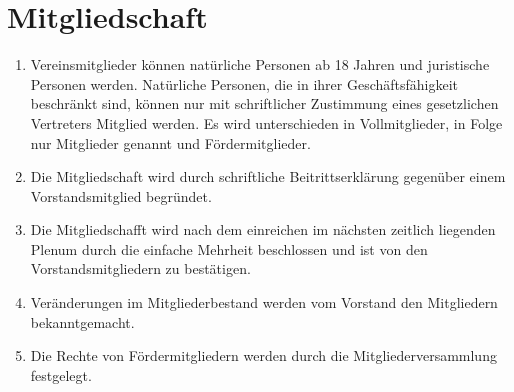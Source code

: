 \documentclass[ngerman]{scrartcl}
\begin{document}
\section{Mitgliedschaft} \label{sec:mitgliedschaft}
\begin{enumerate}
 \item Vereinsmitglieder können natürliche Personen ab 18 Jahren
 und  juristische Personen werden. Natürliche Personen, die in
 ihrer Geschäftsfähigkeit beschränkt sind, können nur mit
 schriftlicher Zustimmung eines gesetzlichen Vertreters
 Mitglied werden. Es wird unterschieden in Vollmitglieder, in
 Folge nur Mitglieder genannt und Fördermitglieder.

 \item Die Mitgliedschaft wird durch schriftliche
 Beitrittserklärung gegenüber einem Vorstandsmitglied
 begründet.

 \item Die Mitgliedschafft wird nach dem einreichen im nächsten
 zeitlich liegenden Plenum durch die einfache Mehrheit beschlossen
 und ist von den Vorstandsmitgliedern zu bestätigen.

 \item Veränderungen im Mitgliederbestand werden vom Vorstand
 den Mitgliedern bekanntgemacht.

 \item Die Rechte von Fördermitgliedern werden durch die
 Mitgliederversammlung festgelegt.
\end{enumerate}
\end{document}
